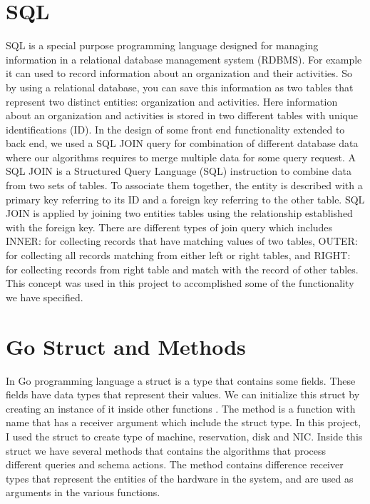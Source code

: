 \section{SQL}
 SQL is a special purpose programming language designed for managing information in a relational database management system (RDBMS). For example it can used to record information about an organization and their activities. So by using a relational database, you can save this information as two tables that represent two distinct entities: organization and activities. Here information about an organization and activities is stored in two different tables with unique identifications (ID). In the design of some front end functionality extended to back end, we used a SQL JOIN query for combination of different database data where our algorithms requires to merge multiple data for some query request. A SQL JOIN is a Structured Query Language (SQL) instruction to combine data from two sets of tables. To associate them together, the entity is described with a primary key referring to its ID and a foreign key referring to the other table. SQL JOIN is applied by joining two entities tables using the relationship established with the foreign key. There are different types of join query which includes INNER: for collecting records that have matching values of two tables, OUTER: for collecting all records matching from either left or right tables, and RIGHT: for collecting records from right table and match with the record of other tables. This concept was used in this project to accomplished some of the functionality we have specified.
\section{Go Struct and Methods}
In Go programming language a struct is a type that contains some fields\cite{Struct}. These fields have data types that represent their values. We can initialize this struct by creating an instance of it inside other functions \cite{Method}. The method is a function with name that has a receiver argument which include the struct type. In this project, I used the struct to create type of machine, reservation, disk and NIC. Inside this struct we have several methods that contains the algorithms that process different  queries and schema actions. The method contains difference receiver types that represent the entities of the hardware in the system, and are used as arguments in the various functions. 



